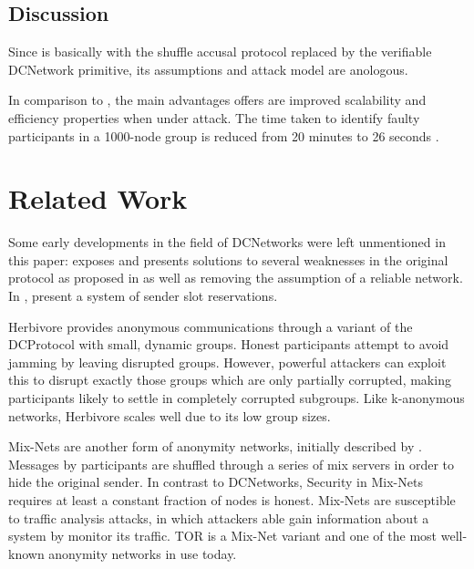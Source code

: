 \subsection{Discussion}

Since \Verdict is basically \Dissent with the shuffle accusal protocol replaced by
the verifiable \ac{DCNetwork} primitive, its assumptions and attack model are anologous.

In comparison to \Dissent, the main advantages \Verdict offers are 
improved scalability and efficiency properties when under attack. The time taken to
identify faulty participants in a 1000-node group is reduced from 20 minutes to 26 seconds \cite{corrigan2013proactively}.


\section{Related Work}

Some early developments in the field of \acp{DCNetwork} were left unmentioned in this paper:
\cite{waidner1989dining} exposes and presents solutions to several weaknesses in the
original protocol as proposed in \cite{journals/joc/Chaum88} as well as removing the assumption
of a reliable network. In \cite{bos1990detection}, \citeauthor{bos1990detection} present a system of sender slot reservations.

Herbivore \cite{goel2003herbivore} provides anonymous communications through a variant of the
\ac{DCProtocol} with small, dynamic groups. Honest participants attempt to avoid jamming by
leaving disrupted groups. However, powerful attackers can exploit this to disrupt exactly those groups
which are only partially corrupted, making participants likely to settle in completely corrupted subgroups.
Like k-anonymous networks, Herbivore scales well due to its low group sizes.


Mix-Nets are another form of anonymity networks, initially described by \citeauthor{journals/cacm/Chaum81}
\cite{journals/cacm/Chaum81}. Messages by participants are shuffled through a series of mix servers
in order to hide the original sender. In contrast to \acp{DCNetwork}, Security in Mix-Nets requires
at least a constant fraction of nodes is honest. Mix-Nets are susceptible to traffic analysis attacks,
in which attackers able gain information about a system by monitor its traffic.
TOR \cite{conf/uss/DingledineMS04} is a Mix-Net variant and one of the most well-known anonymity networks
in use today.

